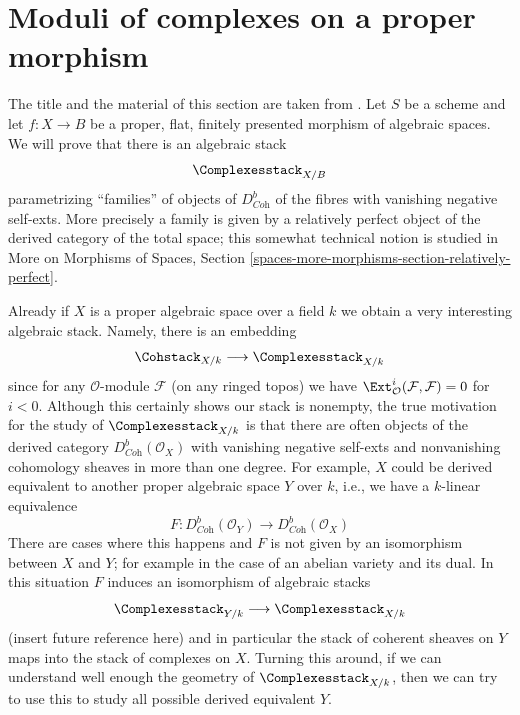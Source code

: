 \section{Moduli of complexes on a proper morphism}
\label{quot-section-moduli-complexes}
The title and the material of this section are taken from
\cite{lieblich-complexes}. Let $S$ be a scheme and let
$f : X \to B$ be a proper, flat, finitely presented morphism
of algebraic spaces. We will prove that there is an
algebraic stack
$$
\Complexesstack_{X/B}
$$
parametrizing ``families'' of objects of $D^b_{\textit{Coh}}$
of the fibres with vanishing negative self-exts. More precisely
a family is given by a relatively perfect object of the derived
category of the total space; this somewhat technical notion
is studied in
More on Morphisms of Spaces, Section
\ref{spaces-more-morphisms-section-relatively-perfect}.

\medskip\noindent
Already if $X$ is a proper algebraic
space over a field $k$ we obtain a very interesting algebraic stack.
Namely, there is an embedding
$$
\Cohstack_{X/k} \longrightarrow \Complexesstack_{X/k}
$$
since for any $\mathcal{O}$-module $\mathcal{F}$ (on any ringed topos)
we have $\Ext^i_\mathcal{O}(\mathcal{F}, \mathcal{F}) = 0$ for $i < 0$.
Although this certainly shows our stack is nonempty, the
true motivation for the study of $\Complexesstack_{X/k}$
is that there are often objects of the derived category
$D^b_{\textit{Coh}}(\mathcal{O}_X)$ with vanishing negative self-exts
and nonvanishing cohomology sheaves in more than one degree.
For example, $X$ could be derived equivalent to another
proper algebraic space $Y$ over $k$, i.e., we have a
$k$-linear equivalence
$$
F : D^b_{\textit{Coh}}(\mathcal{O}_Y)
\longrightarrow
D^b_{\textit{Coh}}(\mathcal{O}_X)
$$
There are cases where this happens and $F$ is not given by
an isomorphism between $X$ and $Y$; for example in the case
of an abelian variety and its dual. In this situation $F$ induces
an isomorphism of algebraic stacks
$$
\Complexesstack_{Y/k}
\longrightarrow
\Complexesstack_{X/k}
$$
(insert future reference here) and in particular the stack of coherent sheaves
on $Y$ maps into the stack of complexes on $X$. Turning this around,
if we can understand well enough the geometry of
$\Complexesstack_{X/k}$, then we can try to use this to study all possible
derived equivalent $Y$.

